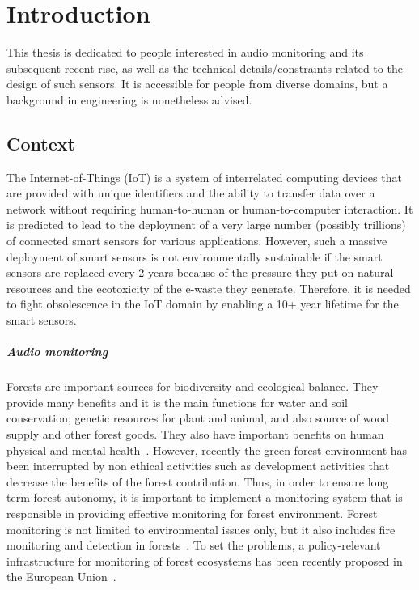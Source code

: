 \documentclass{EPL-master-thesis-covers-EN}
\begin{document}
\tableofcontents

\listoffigures

\listoftables

\newpage

\hypersetup{pageanchor=true}


\chapter{Introduction}

This thesis is dedicated to people interested in audio monitoring and its subsequent recent rise, as well as the technical details/constraints related to the design of such sensors. It is accessible for people from diverse domains, but a background in engineering is nonetheless advised.

\section*{Context}

The Internet-of-Things (IoT) is a system of interrelated computing devices that are provided with unique identifiers and the ability to transfer data over a network without requiring human-to-human or human-to-computer interaction. It is predicted to lead to the deployment of a very large number (possibly trillions) of connected smart sensors for various applications. However, such a massive deployment of smart sensors is not environmentally sustainable if the smart sensors are replaced every 2 years because of the pressure they put on natural resources and the ecotoxicity of the e-waste they generate. Therefore, it is needed to fight obsolescence in the IoT domain by enabling a 10+ year lifetime for the smart sensors. 

\paragraph{Audio monitoring}

Forests are important sources for biodiversity and ecological balance. They provide many benefits and it is the main functions for water and soil conservation, genetic resources for plant and animal, and also source of wood supply and other forest goods. They also have important benefits on human physical and mental health~\cite{Meyer-Schulz}. However, recently the green forest environment has been interrupted by non ethical activities such as development activities that decrease the benefits of the forest contribution.
Thus, in order to ensure long term forest autonomy, it is important to implement a monitoring system that is responsible in providing effective monitoring for forest environment. Forest monitoring is not limited to environmental issues only, but it also includes fire monitoring and detection in forests~\cite{OTHMAN20121204}. To set the problems, a policy-relevant infrastructure for monitoring of forest ecosystems has been recently proposed in the European Union~\cite{ICP_Forests}.
\end{document}
